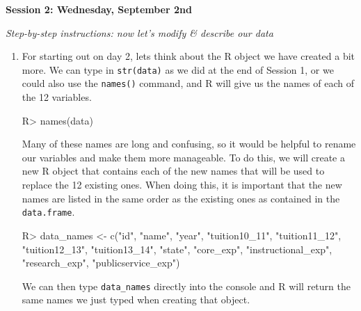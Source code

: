 \documentclass{article}
\newenvironment{Schunk}{}{}
\newcommand{\code}[1]{\texttt{#1}}
\newcommand{\proglang}[1]{\textsf{#1}}
\begin{document}
{\begin{enumerate}[leftmargin=15mm]
\begin{enumerate}[label=\Alph*.  ]
\end{enumerate}

\end{enumerate}


\setlength{\leftskip}{0cm}

\large{\textbf{Session 2: Wednesday, September 2nd}}

\vspace{4mm}
\setlength{\leftskip}{1cm}
\textit{Step-by-step instructions: now let's modify \& describe our data}

\begin{enumerate}[leftmargin=15mm]

\item For starting out on day 2, lets think about the \proglang{R} object we have created a bit more.  We can type in \code{str(data)} as we did at the end of Session 1, or we could also use the \code{names()} command, and \proglang{R} will give us the names of each of the 12 variables.

\begin{Schunk}
\begin{Sinput}

R> names(data)

\end{Sinput}
\end{Schunk}

Many of these names are long and confusing, so it would be helpful to rename our variables and make them more manageable.  To do this, we will create a new \proglang{R} object that contains each of the new names that will be used to replace the 12 existing ones.  When doing this, it is important that the new names are listed in the same order as the existing ones as contained in the \code{data.frame}.

\begin{Schunk}
\begin{Sinput}

R> data_names <- c("id", "name", "year", "tuition10_11", 
"tuition11_12", "tuition12_13", "tuition13_14", "state", 
"core_exp", "instructional_exp", "research_exp", 
"publicservice_exp")

\end{Sinput}
\end{Schunk}

We can then type \code{data\_names} directly into the console and \proglang{R} will return the same names we just typed when creating that object.


\end{enumerate}}
\end{document}
